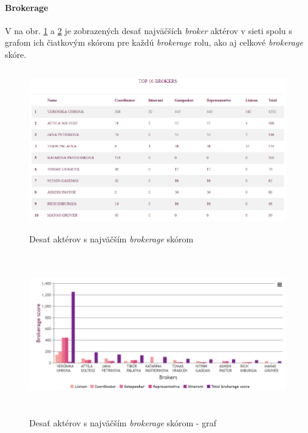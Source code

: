\documentclass[slovak,master,public,dept460,male,cpdeclaration,oneside]{diploma}
\begin{document}
\paragraph{Brokerage}
\hfill \break
V na obr. \ref{analyza_jednotlivca_brokerage} a \ref{analyza_jednotlivca_brokerage_graph} je zobrazených desať najväčších \textit{broker} aktérov v sieti spolu s grafom ich čiatkovým skórom pre každú \textit{brokerage} rolu, ako aj celkové \textit{brokerage} skóre.

\begin{figure}[H]
\centering
\includegraphics[width=12cm, height=7cm]{figures/analyza_jednotlivca_brokerage}
\caption{Desať aktérov s najväčším \textit{brokerage} skórom}
\label{analyza_jednotlivca_brokerage}
\end{figure}


\begin{figure}[H]
\centering
\includegraphics[width=13cm, height=7cm]{figures/analyza_jednotlivca_brokerage_graph}
\caption{Desať aktérov s najväčším \textit{brokerage} skórom - graf}
\label{analyza_jednotlivca_brokerage_graph}
\end{figure}
\end{document}
